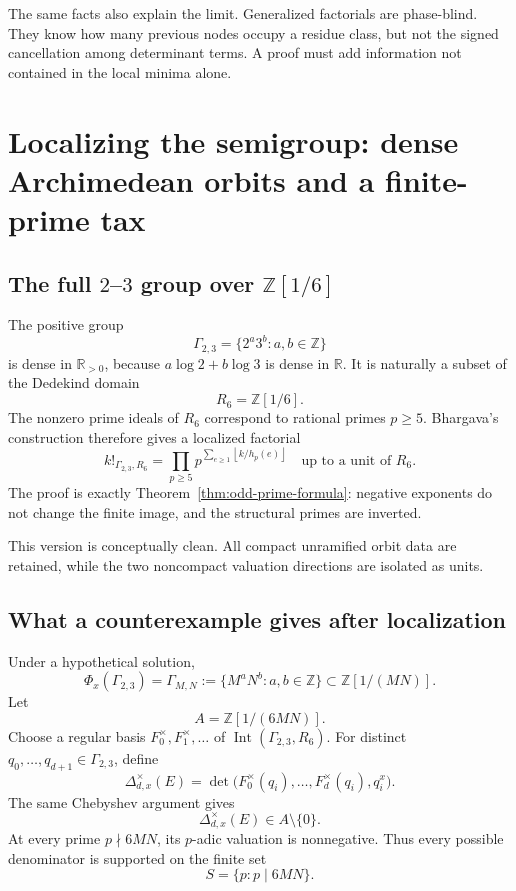 \documentclass[11pt,oneside]{article}
\theoremstyle{definition}
\theoremstyle{remark}
\newcommand{\Z}{\mathbb Z}
\newcommand{\R}{\mathbb R}
\newcommand{\GammaTwoThree}{\Gamma_{2,3}}
\newcommand{\Int}{\operatorname{Int}}
\newcommand{\floor}[1]{\left\lfloor #1\right\rfloor}
\begin{document}
The same facts also explain the limit.  Generalized factorials are phase-blind.  They know how
many previous nodes occupy a residue class, but not the signed cancellation among determinant
terms.  A proof must add information not contained in the local minima alone.

\section{Localizing the semigroup: dense Archimedean orbits and a finite-prime tax}
\label{sec:localized}

\subsection{The full \(2\)--\(3\) group over \(\Z[1/6]\)}

The positive group
\[
 \GammaTwoThree=\{2^a3^b:a,b\in\Z\}
\]
is dense in \(\R_{>0}\), because \(a\log2+b\log3\) is dense in \(\R\).  It is naturally a
subset of the Dedekind domain
\[
 R_6=\Z[1/6].
\]
The nonzero prime ideals of \(R_6\) correspond to rational primes \(p\ge5\).  Bhargava's
construction therefore gives a localized factorial
\begin{equation}
 k!_{\GammaTwoThree,R_6}
 =
 \prod_{p\ge5}
 p^{\displaystyle\sum_{e\ge1}\floor{k/h_p(e)}}
 \quad\text{up to a unit of }R_6.
 \label{eq:localized-factorial}
\end{equation}
The proof is exactly Theorem~\ref{thm:odd-prime-formula}: negative exponents do not change the
finite image, and the structural primes are inverted.

This version is conceptually clean.  All compact unramified orbit data are retained, while the
two noncompact valuation directions are isolated as units.

\subsection{What a counterexample gives after localization}

Under a hypothetical solution,
\[
 \Phi_x(\GammaTwoThree)
 =
 \Gamma_{M,N}:=\{M^aN^b:a,b\in\Z\}
 \subset \Z[1/(MN)].
\]
Let
\[
 A=\Z[1/(6MN)].
\]
Choose a regular basis \(F_0^\times,F_1^\times,\ldots\) of
\(\Int(\GammaTwoThree,R_6)\).  For distinct \(q_0,\ldots,q_{d+1}\in\GammaTwoThree\), define
\[
 \Delta^\times_{d,x}(E)
 =
 \det\bigl(F_0^\times(q_i),\ldots,F_d^\times(q_i),q_i^x\bigr).
\]
The same Chebyshev argument gives
\begin{equation}
 \Delta^\times_{d,x}(E)\in A\setminus\{0\}.
 \label{eq:localized-delta}
\end{equation}
At every prime \(p\nmid6MN\), its \(p\)-adic valuation is nonnegative.  Thus every possible
denominator is supported on the finite set
\[
 S=\{p:p\mid6MN\}.
\]
\end{document}
